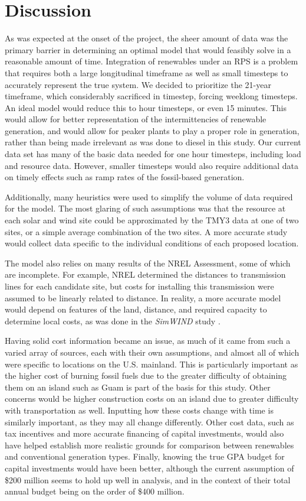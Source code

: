 \documentclass[12pt,letterpaper,fleqn]{article}
\begin{document}
\section{Discussion}

As was expected at the onset of the project, the sheer amount of data
was the primary barrier in determining an optimal model that would
feasibly solve in a reasonable amount of time. Integration of
renewables under an RPS is a problem that requires both a large
longitudinal timeframe as well as small timesteps to accurately
represent the true system. We decided to prioritize the 21-year
timeframe, which considerably sacrificed in timestep, forcing weeklong
timesteps. An ideal model would reduce this to hour timesteps, or even
15 minutes. This would allow for better representation of the intermittencies 
of renewable generation, and would allow for peaker plants to play a proper
role in generation, rather than being made irrelevant as was done to diesel
in this study. Our current data set has many of the basic data needed for
one hour timesteps, including load and resource data. However, smaller
timesteps would also require additional data on timely effects such as
ramp rates of the fossil-based generation. 

Additionally, many heuristics were used to simplify the volume of data
required for the model. The most glaring of such assumptions was that the
resource at each solar and wind site could be approximated by the TMY3
data at one of two sites, or a simple average combination of the two
sites. A more accurate study would collect data specific to the
individual conditions of each proposed location.

The model also relies on many results of the NREL Assessment, some of
which are incomplete. For example, NREL determined the distances to
transmission lines for each candidate site, but costs for installing
this transmission were assumed to be linearly related to distance. In
reality, a more accurate model would depend on features of the land,
distance, and required capacity to determine local costs, as was done
in the \emph{SimWIND} study \cite{phillips12}. 

Having solid cost information became an issue, as much of it came from
such a varied array of sources, each with their own assumptions, and
almost all of which were specific to locations on the
U.S. mainland. This is particularly important as the higher cost of
burning fossil fuels due to the greater difficulty of obtaining them
on an island such as Guam is part of the basis for this study. Other
concerns would be higher construction costs on an island due to
greater difficulty with transportation as well. Inputting how these
costs change with time is similarly important, as they may all change
differently. Other cost data, such as tax incentives and more accurate
financing of capital investments, would also have helped establish
more realistic grounds for comparison between renewables and
conventional generation types. Finally, knowing the true GPA budget
for capital investments would have been better, although the current
assumption of \$200 million seems to hold up well in analysis, and in
the context of their total annual budget being on the order of \$400
million.
\end{document}
